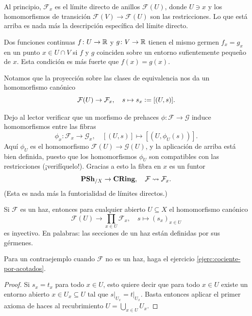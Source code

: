 \documentclass{article}
\numberwithin{equation}{section}
\theoremstyle{definition}
\begin{document}
Al principio, $\mathcal{F}_x$ es el límite directo de anillos $\mathcal{F} (U)$,
donde $U \ni x$ y los homomorfismos de transición
$\mathcal{F} (V) \to \mathcal{F} (U)$ son las restricciones. Lo que está arriba
es nada más la descripción específica del límite directo.

\begin{ejemplo}
  Dos funciones continuas $f\colon U\to \mathbb{R}$ y $g\colon V\to \mathbb{R}$ tienen
  el mismo germen $f_x = g_x$ en un punto $x \in U\cap V$ si $f$ y $g$ coinciden
  sobre un entorno sufientemente pequeño de $x$. Esta condición es más fuerte
  que $f (x) = g (x)$.
\end{ejemplo}

Notamos que la proyección sobre las clases de equivalencia nos da un
homomorfismo canónico
$$\mathcal{F} (U) \to \mathcal{F}_x, \quad s \mapsto s_x \mathrel{\mathop:}= [(U,s)].$$

Dejo al lector verificar que un morfismo de prehaces
$\phi\colon \mathcal{F} \to \mathcal{G}$ induce homomorfismos entre las fibras
\[ \phi_x\colon \mathcal{F}_x \to \mathcal{G}_x, \quad
   [(U,s)] \mapsto [(U, \phi_U (s))]. \]
Aquí $\phi_U$ es el homomorfismo $\mathcal{F} (U) \to \mathcal{G} (U)$,
y la aplicación de arriba está bien definida, puesto que los homomorfismos
$\phi_U$ son compatibles con las restricciones (¡verifíquelo!). Gracias a esto
la fibra en $x$ es un funtor
\[ \text{\bf PSh}_{/X} \to \text{\bf CRing}, \quad
   \mathcal{F} \rightsquigarrow \mathcal{F}_x. \]
(Esta es nada más la funtorialidad de límites directos.)

\begin{lema}
  \label{lema:fibras-y-secciones-de-haz}
  Si $\mathcal{F}$ es un haz, entonces para cualquier abierto $U \subseteq X$
  el homomorfismo canónico
  \[ \mathcal{F} (U) \to \prod_{x\in U} \mathcal{F}_x, \quad
     s \mapsto (s_x)_{x \in U} \]
  es inyectivo. En palabras: las secciones de un haz están definidas por sus
  gérmenes.
\end{lema}

Para un contraejemplo cuando $\mathcal{F}$ no es un haz, haga el ejercicio
\ref{ejerc:cociente-por-acotados}.

\begin{proof}
  Si $s_x = t_x$ para todo $x \in U$, esto quiere decir que para todo $x \in U$
  existe un entorno abierto ${x \in U_x \subseteq U}$ tal que
  $\left.s\right|_{U_x} = \left.t\right|_{U_x}$. Basta entonces aplicar
  el primer axioma de haces al recubrimiento ${U = \bigcup_{x\in U} U_x}$.
\end{proof}
\end{document}
